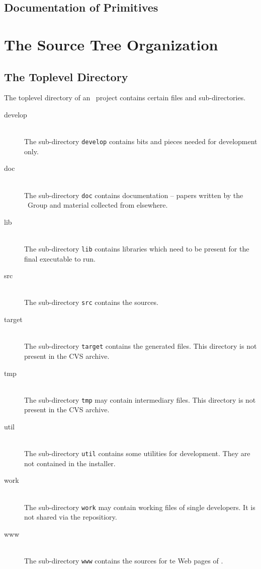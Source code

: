 \documentclass{extex-doc}
\begin{document}
\section{Documentation of Primitives}

\INCOMPLETE




\chapter{The Source Tree Organization}

\section{The Toplevel Directory}

The toplevel directory of an \ExTeX\ project contains certain files
and sub-directories.

\begin{description}
\item[develop] \ \\
  The sub-directory \texttt{develop} contains bits and pieces needed
  for development only.
\item[doc]  \ \\
  The sub-directory \texttt{doc} contains documentation -- papers
  written by the \ExTeX\ Group and material collected from elsewhere.
\item[lib]  \ \\
  The sub-directory \texttt{lib} contains libraries which need to be
  present for the final executable to run.
\item[src]  \ \\
  The sub-directory \texttt{src} contains the sources.
\item[target]  \ \\
  The sub-directory \texttt{target} contains the generated files. This
  directory is not present in the CVS archive.
\item[tmp]  \ \\
  The sub-directory \texttt{tmp} may contain intermediary files. This
  directory is not present in the CVS archive.
\item[util]  \ \\
  The sub-directory \texttt{util} contains some utilities for
  development. They are not contained in the installer.
\item[work]  \ \\
  The sub-directory \texttt{work} may contain working files of single
  developers. It is not shared via the repositiory.
\item[www]  \ \\
  The sub-directory \texttt{www} contains the sources for te Web pages
  of \ExTeX.
\end{description}
\end{document}
